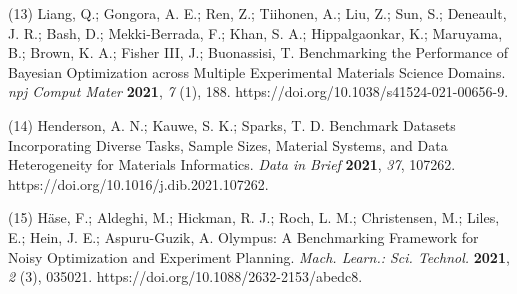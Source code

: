(13) Liang, Q.; Gongora, A. E.; Ren, Z.; Tiihonen, A.; Liu, Z.; Sun, S.;
Deneault, J. R.; Bash, D.; Mekki-Berrada, F.; Khan, S. A.;
Hippalgaonkar, K.; Maruyama, B.; Brown, K. A.; Fisher III, J.;
Buonassisi, T. Benchmarking the Performance of Bayesian Optimization
across Multiple Experimental Materials Science Domains. \emph{npj Comput
Mater} \textbf{2021}, \emph{7} (1), 188.
https://doi.org/10.1038/s41524-021-00656-9.

(14) Henderson, A. N.; Kauwe, S. K.; Sparks, T. D. Benchmark Datasets
Incorporating Diverse Tasks, Sample Sizes, Material Systems, and Data
Heterogeneity for Materials Informatics. \emph{Data in Brief}
\textbf{2021}, \emph{37}, 107262.
https://doi.org/10.1016/j.dib.2021.107262.

(15) Häse, F.; Aldeghi, M.; Hickman, R. J.; Roch, L. M.; Christensen,
M.; Liles, E.; Hein, J. E.; Aspuru-Guzik, A. Olympus: A Benchmarking
Framework for Noisy Optimization and Experiment Planning. \emph{Mach.
Learn.: Sci. Technol.} \textbf{2021}, \emph{2} (3), 035021.
https://doi.org/10.1088/2632-2153/abedc8.
